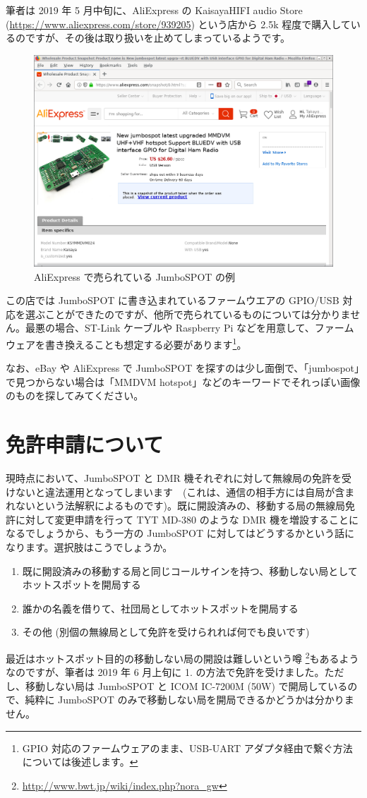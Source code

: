 \documentclass[a4j,oneside]{ujbook}
\begin{document}
筆者は 2019 年 5 月中旬に、AliExpress の KaisayaHIFI audio Store (\url{https://www.aliexpress.com/store/939205}) という店から \yen2.5k 程度で購入しているのですが、その後は取り扱いを止めてしまっているようです。
\begin{figure}[H]
 \centering
 \includegraphics[width=15cm]{img/jumbospot-aliexpress.png}
 \caption{AliExpress で売られている JumboSPOT の例}
\end{figure}
この店では JumboSPOT に書き込まれているファームウエアの GPIO/USB 対応を選ぶことができたのですが、他所で売られているものについては分かりません。最悪の場合、ST-Link ケーブルや Raspberry Pi などを用意して、ファームウェアを書き換えることも想定する必要があります\footnote{GPIO 対応のファームウェアのまま、USB-UART アダプタ経由で繋ぐ方法については後述します。}。

なお、eBay や AliExpress で JumboSPOT を探すのは少し面倒で、「jumbospot」で見つからない場合は「MMDVM hotspot」などのキーワードでそれっぽい画像のものを探してみてください。

\section{免許申請について}

現時点において、JumboSPOT と DMR 機それぞれに対して無線局の免許を受けないと違法運用となってしまいます　(これは、通信の相手方には自局が含まれないという法解釈によるものです)。既に開設済みの、移動する局の無線局免許に対して変更申請を行って TYT MD-380 のような DMR 機を増設することになるでしょうから、もう一方の JumboSPOT に対してはどうするかという話になります。選択肢はこうでしょうか。
\begin{enumerate}
 \item 既に開設済みの移動する局と同じコールサインを持つ、移動しない局としてホットスポットを開局する
 \item 誰かの名義を借りて、社団局としてホットスポットを開局する
 \item その他 (別個の無線局として免許を受けられれば何でも良いです)
\end{enumerate}
最近はホットスポット目的の移動しない局の開設は難しいという噂 \footnote{\url{http://www.bwt.jp/wiki/index.php?nora_gw}}もあるようなのですが、筆者は 2019 年 6 月上旬に 1. の方法で免許を受けました。ただし、移動しない局は JumboSPOT と ICOM IC-7200M (50W) で開局しているので、純粋に JumboSPOT のみで移動しない局を開局できるかどうかは分かりません。
\end{document}
